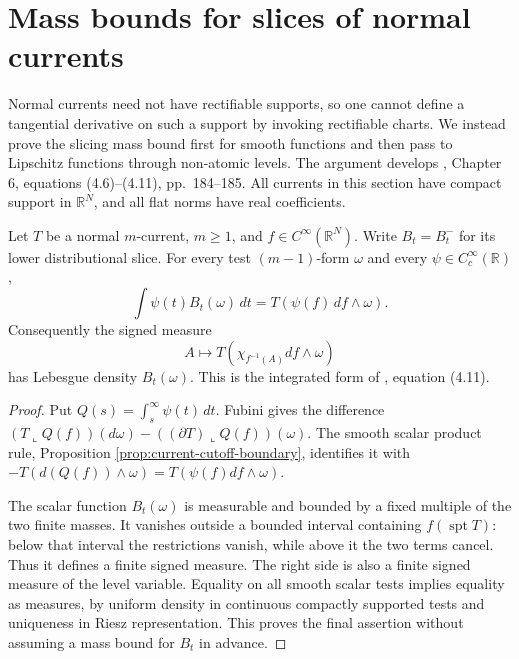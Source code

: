 \chapter{Mass bounds for slices of normal currents}\label{sec:normal-current-slicing}
Normal currents need not have rectifiable supports, so one cannot define a tangential derivative on such a support by invoking rectifiable charts. We instead prove the slicing mass bound first for smooth functions and then pass to Lipschitz functions through non-atomic levels. The argument develops \cite{Sim18}, Chapter 6, equations (4.6)--(4.11), pp.~184--185. All currents in this section have compact support in $\mathbb R^N$, and all flat norms have real coefficients.

\begin{lemma}\label{lem:normal-slice-smooth-integrated}
Let $T$ be a normal $m$-current, $m\geq1$, and $f\in C^\infty(\mathbb R^N)$. Write $B_t=B_t^-$ for its lower distributional slice. For every test $(m-1)$-form $\omega$ and every $\psi\in C_c^\infty(\mathbb R)$,
\[
 \int\psi(t)B_t(\omega)\,dt=T(\psi(f)\,df\wedge\omega).
\]
Consequently the signed measure
\[
 A\longmapsto T(\chi_{f^{-1}(A)}df\wedge\omega)
\]
has Lebesgue density $B_t(\omega)$. This is the integrated form of \cite{Sim18}, equation (4.11).
\end{lemma}
\begin{proof}
Put $Q(s)=\int_s^\infty\psi(t)\,dt$. Fubini gives the difference $(T\llcorner Q(f))(d\omega)-((\partial T)\llcorner Q(f))(\omega)$. The smooth scalar product rule, Proposition \ref{prop:current-cutoff-boundary}, identifies it with $-T(d(Q(f))\wedge\omega)=T(\psi(f)df\wedge\omega)$.

The scalar function $B_t(\omega)$ is measurable and bounded by a fixed multiple of the two finite masses. It vanishes outside a bounded interval containing $f(\operatorname{spt}T)$: below that interval the restrictions vanish, while above it the two terms cancel. Thus it defines a finite signed measure. The right side is also a finite signed measure of the level variable. Equality on all smooth scalar tests implies equality as measures, by uniform density in continuous compactly supported tests and uniqueness in Riesz representation. This proves the final assertion without assuming a mass bound for $B_t$ in advance.
\end{proof}

